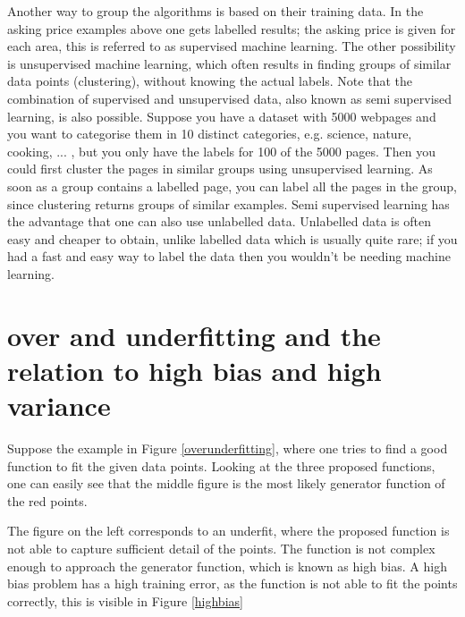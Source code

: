 \npar

Another way to group the algorithms is based on their training data. In the asking price examples above one gets labelled results; the asking price is given for each area, this is referred to as supervised machine learning. The other possibility is unsupervised machine learning, which often results in finding groups of similar data points (clustering), without knowing the actual labels. Note that the combination of supervised and unsupervised data, also known as semi supervised learning, is also possible. Suppose you have a dataset with 5000 webpages and you want to categorise them in 10 distinct categories, e.g. science, nature, cooking, ... , but you only have the labels for 100 of the 5000 pages. Then you could first cluster the pages in similar groups using unsupervised learning. As soon as a group contains a labelled page, you can label all the pages in the group, since clustering returns groups of similar examples. Semi supervised learning has the advantage that one can also use unlabelled data. Unlabelled data is often easy and cheaper to obtain, unlike labelled data which is usually quite rare; if you had a fast and easy way to label the data then you wouldn't be needing machine learning.

\section{over and underfitting and the relation to high bias and high variance}


Suppose the example in Figure \ref{overunderfitting}, where one tries to find a good function to fit the given data points. Looking at the three proposed functions, one can easily see that the middle figure is the most likely generator function of the red points. 

The figure on the left corresponds to an underfit, where the proposed function is not able to capture sufficient detail of the points. The function is not complex enough to approach the generator function, which is known as high bias. A high bias problem has a high training error, as the function is not able to fit the points correctly, this is visible in Figure \ref{highbias}


